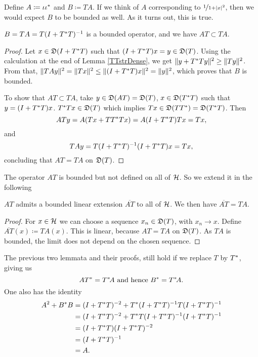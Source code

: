 Define $A \coloneqq \iota \iota ^{*}$ and $B \coloneqq TA$. 
If we think of $A$ corresponding to $\nicefrac{1}{1 + |x|^2}$, then we would expect
$B$ to be bounded as well.
As it turns out, this is true.
\begin{lem}\label{BBounded}
 $B = TA = T(I + T ^{*} T)^{-1}$ is a bounded operator, and we have
 $AT \subset TA$.
\end{lem}



\begin{proof}
 Let $x \in \mathfrak{D}(I + T ^{*} T)$ such that $(I + T ^{*} T)x = y \in \mathfrak{D}(T)$.
 Using the calculation at the end of Lemma \ref{TTstrDense}, we get 
 $\| y + T^{*} T y \|^2 \geq \|Ty\|^2$.
From that, $\| TAy\|^2 = \| Tx \| ^2 \leq \| (I + T ^{*} T)x \|^2 = \| y \| ^2$,
which proves that $B$ is bounded. 

To show that $AT \subset TA$, take $y \in \mathfrak{D}(AT) = \mathfrak{D}(T)$,
$x \in \mathfrak{D}(T ^{*} T)$ such that $y = ( I +  T ^{*} T)x$. $T ^{*} T x \in \mathfrak{D}(T)$
which implies $Tx \in \mathfrak{D}(TT^{*}) = \mathfrak{D}(T^{*} T)$. Then 
\[
 ATy = A(Tx + T T^{*} T x) = A(I + T^{*} T)Tx= Tx,
\]
and
\[
 TAy= T(I+ T^{*} T)^{-1} (I + T ^{*} T)x=Tx,
\]
concluding that $AT = TA$ on $\mathfrak{D}(T)$.

\end{proof}

The operator $AT$ is bounded but not defined on all of $\mathcal{H}$. So we extend it
in the following

\begin{lem}
 $AT$ admits a bounded linear extension $\overline{AT}$ to all of $\mathcal{H}$. 
 We then have $\overline{AT}=TA$.
\end{lem}

\begin{proof}
 For $x \in \mathcal{H}$ we can choose a sequence $x_n \in \mathfrak{D}(T)$, with 
 $x_n \rightarrow x$. Define $\overline{AT}(x) \coloneqq TA(x)$.
 This is linear, because $AT = TA$ on $\mathfrak{D}(T)$. As $TA$ is bounded,
 the limit does not depend on the chosen sequence.
\end{proof}

\begin{rem}
 The previous two lemmata and their proofs, still hold if we replace $T$ by $T^{*}$,
 giving us 
 \[
  AT^{*} = T^{*} \! A \text{ and hence } B^{*} = T^{*} \! A.
 \]
 One also has the identity
 \begin{align*}
  A^2 + B^{*} B &= (I + T^{*} T)^{-2} + T ^{*} (I + T^{*} T)
		    ^{-1} T (I + T^{*} T) ^{-1} \\
		&= (I + T^{*} T)^{-2} + T ^{*} T(I + T^{*} T)
		   ^{-1} (I + T^{*} T) ^{-1} \\
		&= (I + T^{*} T)(I + T^{*} T)^{-2} \\
		&= (I + T^{*} T)^{-1}  \\
		&= A .
  \end{align*}

  

\end{rem}

